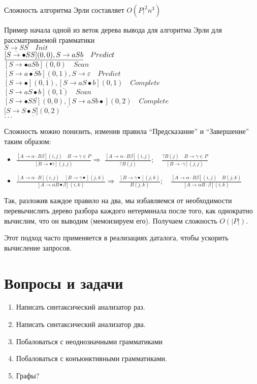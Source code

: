 Сложность алгоритма Эрли составляет $O(P|^2n^3)$

\begin{example} Пример начала одной из веток дерева вывода для алгоритма Эрли для рассматриваемой грамматики\\
	
	$\underline{S \rightarrow SS} \quad Init$\\
	$\underline{[S \rightarrow \bullet SS](0,0), \space S \rightarrow aSb} \quad Predict$\\
	$\underline{[S \rightarrow \bullet aSb](0,0)} \quad Scan$\\
	$\underline{[S \rightarrow a \bullet Sb](0,1), S \rightarrow \varepsilon} \quad Predict$\\
	$\underline{[S \rightarrow \bullet](0, 1), [S \rightarrow aS \bullet b](0,1)} \quad Complete$\\
	$\underline{[S \rightarrow aS \bullet b](0,1)} \quad Scan$\\
	$\underline{[S \rightarrow \bullet SS](0,0),[S \rightarrow aSb \bullet](0,2)} \quad Complete$\\
	$[\underline{S \rightarrow S \bullet S](0,2)}$\\
	$\cdot\cdot\cdot$
	
\end{example}

Сложность можно понизить, изменив правила ``Предсказание'' и ``Завершение'' таким образом:
\begin{itemize}
	\item $\frac{[A \rightarrow \alpha \cdot B \beta](i, j) \quad B \rightarrow \gamma \in P}{[B \rightarrow \bullet \gamma](j, j)} \Rightarrow$ $
	\frac{[A \rightarrow \alpha \cdot B \beta](i, j)}{? B(j)}; \quad \frac{? B(j) \quad B \rightarrow \gamma \in P}{[B \rightarrow \cdot \gamma](j, j)}$
	\item $\frac{[A \rightarrow \alpha \cdot B](i, j) \quad[B \rightarrow \gamma \bullet](j, k)}{[A \rightarrow \alpha B \bullet \beta](i, k)} \Rightarrow$ $\frac{[B \rightarrow \gamma \bullet](j, k)}{B(j, k)}; \quad \frac{[A \rightarrow \alpha \cdot B \beta](i, j) \quad B(j, k)}{[A \rightarrow \alpha B \cdot \beta](i, k)}$
\end{itemize}
Так, разложив каждое правило на два, мы избавляемся от необходимости перевычислять дерево разбора каждого нетерминала после того, как однократно вычислим, что он выводим (мемоизируем его). Получаем сложность $O(|P|)$.

Этот подход часто применяется в реализациях даталога, чтобы ускорить вычисление запросов.




\section{Вопросы и задачи}
\begin{enumerate}
  \item Написать синтаксический анализатор раз.
  \item Написать синтаксический анализатор два.
  \item Побаловаться с неоднозначными грамматиками
  \item Побаловаться с конъюнктивными грамматиками.
  \item Графы?
\end{enumerate}
